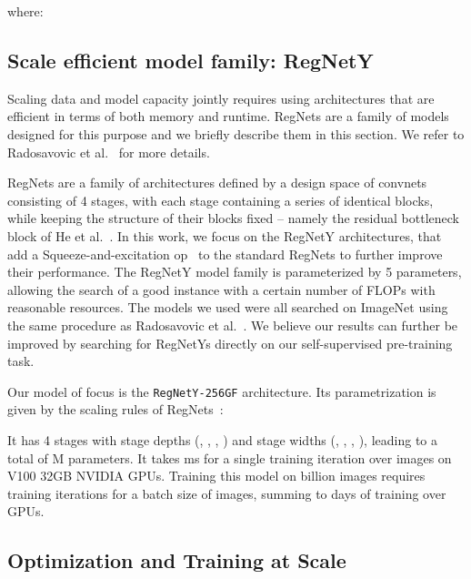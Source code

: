 \documentclass[final]{cvpr}
\renewcommand{\paragraph}[1]{\vspace{0.07in}\noindent {\bf #1}}
\begin{document}
where:


\subsection{Scale efficient model family: RegNetY}

Scaling data and model capacity jointly requires using architectures that are efficient in terms of both 
memory and runtime.
RegNets are a family of models designed for this purpose and we briefly describe them in this section. 
We refer to Radosavovic et al.~\cite{radosavovic2020designing} for more details.


RegNets are a family of architectures defined by a design space of convnets consisting of 4 stages, with each stage containing a series of identical blocks, while keeping the structure of their blocks fixed -- namely the residual bottleneck block of He et al.~\cite{he2016deep}. In this work, we focus on the RegNetY architectures, that add a Squeeze-and-excitation op~\cite{hu2018squeeze} to the standard RegNets to further improve their performance. The RegNetY model family is parameterized by 5 parameters, allowing the search of a good instance with a certain number of FLOPs with reasonable resources. The models we used were all searched on ImageNet using the same procedure as Radosavovic et al.~\cite{radosavovic2020designing}. We believe our results can further be improved by searching for RegNetYs directly on our self-supervised pre-training task.





\paragraph{The \texttt{RegNetY-256GF} architecture.}
Our model of focus is the \texttt{RegNetY-256GF} architecture. 
Its parametrization is given by the scaling rules of RegNets~\cite{radosavovic2020designing}: 


It has 4 stages with stage depths (, , , ) and stage widths (, , , ), leading to a total of M parameters.
It takes ms for a single training iteration over  images on  V100 32GB NVIDIA GPUs.
Training this model on  billion images requires  training iterations for a batch size of  images, summing to  days of training over  GPUs.


\subsection{Optimization and Training at Scale}
\end{document}

